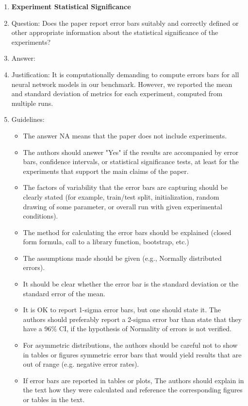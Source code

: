 \documentclass{article}
\theoremstyle{plain}
\theoremstyle{definition}
\theoremstyle{remark}
\begin{document}
\begin{enumerate}
\item {\bf Experiment Statistical Significance}
    \item[] Question: Does the paper report error bars suitably and correctly defined or other appropriate information about the statistical significance of the experiments?
    \item[] Answer: \answerNo{} %
    \item[] Justification: It is computationally demanding to compute errors bars for all neural network models in our benchmark. However, we reported the mean and standard deviation of metrics for each experiment, computed from multiple runs.
    \item[] Guidelines:
    \begin{itemize}
        \item The answer NA means that the paper does not include experiments.
        \item The authors should answer "Yes" if the results are accompanied by error bars, confidence intervals, or statistical significance tests, at least for the experiments that support the main claims of the paper.
        \item The factors of variability that the error bars are capturing should be clearly stated (for example, train/test split, initialization, random drawing of some parameter, or overall run with given experimental conditions).
        \item The method for calculating the error bars should be explained (closed form formula, call to a library function, bootstrap, etc.)
        \item The assumptions made should be given (e.g., Normally distributed errors).
        \item It should be clear whether the error bar is the standard deviation or the standard error of the mean.
        \item It is OK to report 1-sigma error bars, but one should state it. The authors should preferably report a 2-sigma error bar than state that they have a 96\% CI, if the hypothesis of Normality of errors is not verified.
        \item For asymmetric distributions, the authors should be careful not to show in tables or figures symmetric error bars that would yield results that are out of range (e.g. negative error rates).
        \item If error bars are reported in tables or plots, The authors should explain in the text how they were calculated and reference the corresponding figures or tables in the text.
    \end{itemize}


\end{enumerate}
\end{document}
